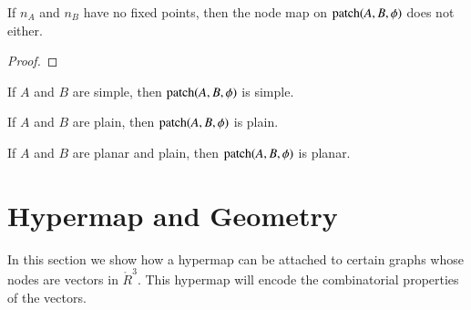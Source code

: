 \begin{lemma} If $n_A$ and $n_B$ have no fixed points, then
    the node map on ${\operatorname{patch}}(A,B,\phi)$ does not either.
\end{lemma}

\begin{proof}
\end{proof}

\begin{lemma} If $A$ and $B$ are simple, then
${\operatorname{patch}}(A,B,\phi)$ is simple.
\end{lemma}

\begin{lemma} If $A$ and $B$ are plain, then
${\operatorname{patch}}(A,B,\phi)$ is plain.
\end{lemma}

\begin{lemma} If $A$ and $B$ are planar and plain, then
    ${\operatorname{patch}}(A,B,\phi)$ is planar.
\end{lemma}




\chapter{Hypermap and Geometry}

In this section we show how a hypermap can be attached to certain
graphs whose nodes are vectors in $\ring{R}^3$. This hypermap will
encode the combinatorial properties of the vectors.




